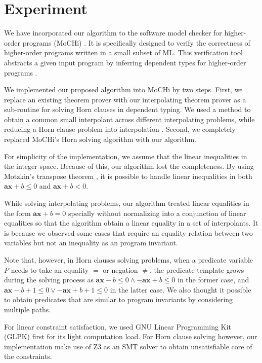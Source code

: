 \chapter{Experiment}
\label{chap:experiment}

We have incorporated our algorithm to the software model checker for
higher-order programs (MoCHi) \cite{conf/pldi/KobayashiSU11}.  It is
specifically designed to verify the correctness of higher-order
programs written in a small subset of ML.  This verification tool
abstracts a given input program by inferring dependent types for
higher-order programs \cite{conf/ppdp/UnnoK09}.

We implemented our proposed algorithm into MoCHi by two steps.  First,
we replace an existing theorem prover with our interpolating theorem
prover as a sub-routine for solving Horn clauses in dependent typing.
We used a method to obtain a common small interpolant across different
interpolating problems, while reducing a Horn clause problem into
interpolation \cite{conf/ppdp/UnnoK09}.  Second, we completely
replaced MoCHi's Horn solving algorithm with our algorithm.

For simplicity of the implementation, we assume that the linear
inequalities in the integer space.  Because of this, our algorithm
lost the completeness.  By using Motzkin's transpose theorem
\cite{journals/networks/Rajan90}, it is possible to handle linear
inequalities in both $\mathbf{ax} + b \leq 0$ and $\mathbf{ax} + b <
0$.

While solving interpolating problems, our algorithm treated linear
equalities in the form $\mathbf{ax} + b = 0$ specially without
normalizing into a conjunction of linear equalities so that the
algorithm obtain a linear equality in a set of interpolants.  It is
because we observed some cases that require an equality relation
between two variables but not an inequality as an program invariant.

Note that, however, in Horn clauses solving problems, when a predicate
variable $P$ needs to take an equality $=$ or negation $\neq$, the
predicate template grows during the solving process as
$\mathbf{ax}-b \leq 0 \wedge -\mathbf{ax}+b \leq 0$ in the former
case, and $\mathbf{ax}-b+1 \leq 0 \vee -\mathbf{ax}+b+1 \leq 0$ in the
latter case.  We also thought it possible to obtain predicates that
are similar to program invariants by considering multiple paths.

For linear constraint satisfaction, we used GNU Linear Programming Kit
(GLPK) first for its light computation load.  For Horn clause solving
however, our implementation make use of Z3 \cite{conf/tacas/MouraB08}
as an SMT solver to obtain unsatisfiable core of the constraints.

